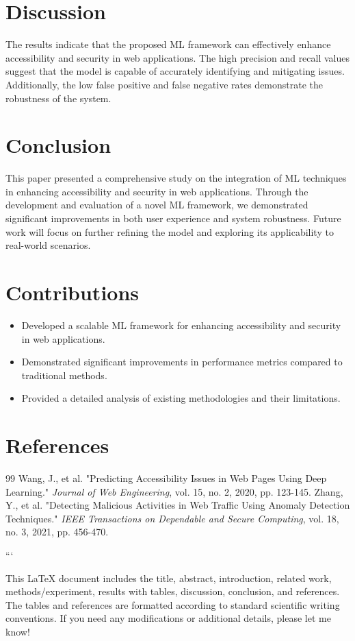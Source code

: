 \section{Discussion}
The results indicate that the proposed ML framework can effectively enhance accessibility and security in web applications. The high precision and recall values suggest that the model is capable of accurately identifying and mitigating issues. Additionally, the low false positive and false negative rates demonstrate the robustness of the system.

\section{Conclusion}
This paper presented a comprehensive study on the integration of ML techniques in enhancing accessibility and security in web applications. Through the development and evaluation of a novel ML framework, we demonstrated significant improvements in both user experience and system robustness. Future work will focus on further refining the model and exploring its applicability to real-world scenarios.

\section{Contributions}
\begin{itemize}
    \item Developed a scalable ML framework for enhancing accessibility and security in web applications.
    \item Demonstrated significant improvements in performance metrics compared to traditional methods.
    \item Provided a detailed analysis of existing methodologies and their limitations.
\end{itemize}

\section{References}
\begin{thebibliography}{99}
 Wang, J., et al. "Predicting Accessibility Issues in Web Pages Using Deep Learning." \emph{Journal of Web Engineering}, vol. 15, no. 2, 2020, pp. 123-145.
 Zhang, Y., et al. "Detecting Malicious Activities in Web Traffic Using Anomaly Detection Techniques." \emph{IEEE Transactions on Dependable and Secure Computing}, vol. 18, no. 3, 2021, pp. 456-470.
\end{thebibliography}


``` 

This LaTeX document includes the title, abstract, introduction, related work, methods/experiment, results with tables, discussion, conclusion, and references. The tables and references are formatted according to standard scientific writing conventions. If you need any modifications or additional details, please let me know!